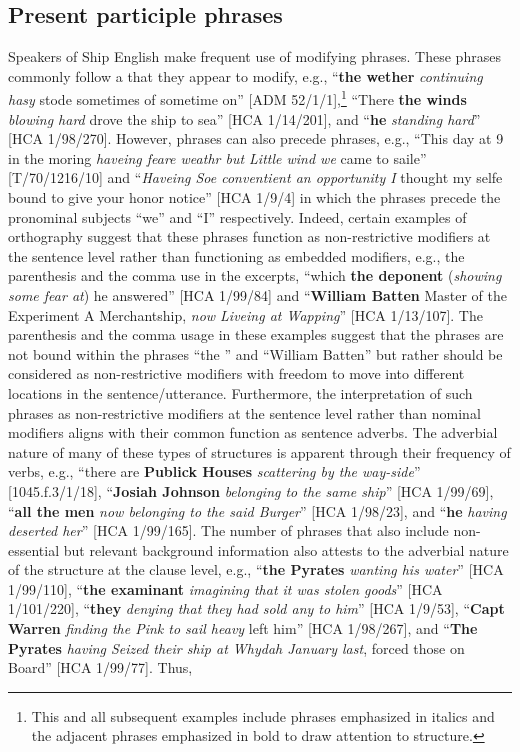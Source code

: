 \subsection{{Present participle phrases} }\label{sec:5.5.2}

Speakers of Ship English make frequent use of modifying  phrases. These  phrases commonly follow a  that they appear to modify, e.g., “\textbf{the wether} \textit{continuing hasy} stode sometimes of sometime on” [ADM 52/1/1],\footnote{This and all subsequent examples include  phrases emphasized in italics and the adjacent  phrases emphasized in bold to draw attention to structure.} “There \textbf{the winds} \textit{blowing hard} drove the ship to sea” [HCA 1/14/201], and “\textbf{he} \textit{standing hard}” [HCA 1/98/270]. However,  phrases can also precede  phrases, e.g., “This day at 9 in the moring \textit{haveing feare weathr but Little wind we} came to saile” [T/70/1216/10] and “\textit{Haveing Soe conventient an opportunity I} thought my selfe bound to give your honor notice” [HCA 1/9/4] in which the  phrases precede the pronominal subjects “we” and “I” respectively. Indeed, certain examples of orthography suggest that these phrases function as non-restrictive modifiers at the sentence level rather than functioning as embedded   modifiers, e.g., the parenthesis and the comma use in the excerpts, “which \textbf{the deponent} (\textit{showing some fear at}) he answered” [HCA 1/99/84] and “\textbf{William Batten} Master of the Experiment A Merchantship, \textit{now Liveing at Wapping}” [HCA 1/13/107]. The parenthesis and the comma usage in these examples suggest that the phrases are not bound within the  phrases “the ” and “William Batten” but rather should be considered as non-restrictive modifiers with freedom to move into different locations in the sentence/utterance. Furthermore, the interpretation of such phrases as non-restrictive modifiers at the sentence level rather than nominal modifiers aligns with their common function as sentence adverbs. The adverbial nature of many of these types of structures is apparent through their frequency of  verbs, e.g., “there are \textbf{Publick Houses} \textit{scattering by the way-side}” [1045.f.3/1/18], “\textbf{Josiah Johnson} \textit{belonging to the same ship}” [HCA 1/99/69], “\textbf{all the men} \textit{now belonging to the said Burger}” [HCA 1/98/23], and “\textbf{he} \textit{having deserted her}” [HCA 1/99/165]. The number of phrases that also include non-essential but relevant background information also attests to the adverbial nature of the structure at the clause level, e.g., “\textbf{the Pyrates} \textit{wanting his water}” [HCA 1/99/110], “\textbf{the examinant} \textit{imagining that it was stolen goods}” [HCA 1/101/220], “\textbf{they} \textit{denying that they had sold any to him}” [HCA 1/9/53], “\textbf{Capt Warren} \textit{finding the Pink to sail heavy} left him” [HCA 1/98/267], and “\textbf{The Pyrates} \textit{having Seized their ship at Whydah January last}, forced those on Board” [HCA 1/99/77]. Thus, 